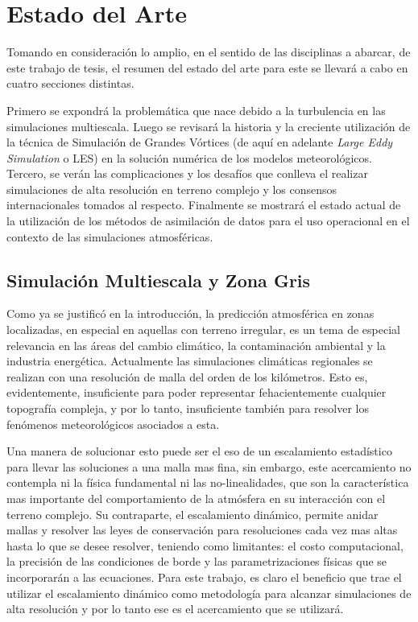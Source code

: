 \chapter{Estado del Arte}
Tomando en consideración lo amplio, en el sentido de las disciplinas a abarcar, de este trabajo de tesis, el resumen del estado del arte para este se llevará a cabo en cuatro secciones distintas. 

Primero se expondrá la problemática que nace debido a la turbulencia en las simulaciones multiescala. Luego se revisará la historia y la creciente utilización de la técnica de Simulación de Grandes Vórtices (de aquí en adelante \emph{Large Eddy Simulation} o LES) en la solución numérica de los modelos meteorológicos. Tercero, se verán las complicaciones y los desafíos que conlleva el realizar simulaciones de alta resolución en terreno complejo y los consensos internacionales tomados al respecto. Finalmente se mostrará el estado actual de la utilización de los métodos de asimilación de datos para el uso operacional en el contexto de las simulaciones atmosféricas.
\section{Simulación Multiescala y Zona Gris}
Como ya se justificó en la introducción, la predicción atmosférica en zonas localizadas, en especial en aquellas con terreno irregular, es un tema de especial relevancia en las áreas del cambio climático, la contaminación ambiental y la industria energética. Actualmente las simulaciones climáticas regionales se realizan con una resolución de malla del orden de los kilómetros. Esto es, evidentemente, insuficiente para poder representar fehacientemente cualquier topografía compleja, y por lo tanto, insuficiente también para resolver los fenómenos meteorológicos asociados a esta.

Una manera de solucionar esto puede ser el eso de un escalamiento estadístico para llevar las soluciones a una malla mas fina, sin embargo, este acercamiento no contempla ni la física fundamental ni las no-linealidades, que son la característica mas importante del comportamiento de la atmósfera en su interacción con el terreno complejo. Su contraparte, el escalamiento dinámico, permite anidar mallas y resolver las leyes de conservación para resoluciones cada vez mas altas hasta lo que se desee resolver, teniendo como limitantes: el costo computacional, la precisión de las condiciones de borde y las parametrizaciones físicas que se incorporarán a las ecuaciones. Para este trabajo, es claro el beneficio que trae el utilizar el escalamiento dinámico como metodología para alcanzar simulaciones de alta resolución y por lo tanto ese es el acercamiento que se utilizará.

